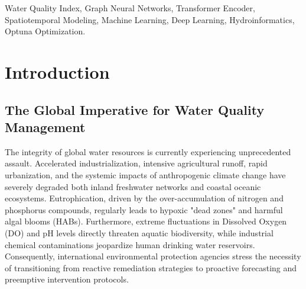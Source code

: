 \documentclass[journal,10pt,twocolumn]{IEEEtran}
\begin{document}
\begin{abstract}
To maximize practical applicability in bureaucratic environmental monitoring, the predictions of core hydro-chemical indicators—including Dissolved Oxygen (DO), pH, and Chemical Oxygen Demand (COD)—are autonomously mathematically aggregated into a deployable Water Quality Index (WQI) based on the rigorous GB 3838-2002 standard. Through exhaustive experimental benchmarking mapping fused inland and oceanic datasets, the proposed Hybrid Transformer-GNN establishes a new predictive benchmark. Demonstrating an unparalleled Mean Absolute Percentage Error (MAPE) of 9.85\%, the architecture radically outperforms conventional analytical baselines including isolated Random Forests (which suffer from tabular flattening bias), baseline LSTMs (15.91\% MAPE), and Standalone GNNs (10.36\% MAPE). This paper comprehensively details the underlying mathematical theories, hyperparameter optimizations via Bayesian Optuna frameworks, and the deployment of the model into a functional, interactive Streamlit early-warning dashboard.
\end{abstract}

\begin{IEEEkeywords}
Water Quality Index, Graph Neural Networks, Transformer Encoder, Spatiotemporal Modeling, Machine Learning, Deep Learning, Hydroinformatics, Optuna Optimization.
\end{IEEEkeywords}

\section{Introduction}

\subsection{The Global Imperative for Water Quality Management}
The integrity of global water resources is currently experiencing unprecedented assault. Accelerated industrialization, intensive agricultural runoff, rapid urbanization, and the systemic impacts of anthropogenic climate change have severely degraded both inland freshwater networks and coastal oceanic ecosystems. Eutrophication, driven by the over-accumulation of nitrogen and phosphorus compounds, regularly leads to hypoxic "dead zones" and harmful algal blooms (HABs). Furthermore, extreme fluctuations in Dissolved Oxygen (DO) and pH levels directly threaten aquatic biodiversity, while industrial chemical contaminations jeopardize human drinking water reservoirs. Consequently, international environmental protection agencies stress the necessity of transitioning from reactive remediation strategies to proactive forecasting and preemptive intervention protocols. 
\end{document}
